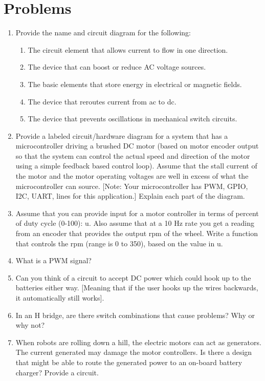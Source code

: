 \hypertarget{problems}{%
\section{Problems}\label{problems}}

\begin{enumerate}
\tightlist
\item
  Provide the name and circuit diagram for the following:

  \begin{enumerate}
  \tightlist
  \item
    The circuit element that allows current to flow in one direction.
  \item
    The device that can boost or reduce AC voltage sources.
  \item
    The basic elements that store energy in electrical or magnetic
    fields.
  \item
    The device that reroutes current from ac to dc.
  \item
    The device that prevents oscillations in mechanical switch circuits.
  \end{enumerate}
\item
  Provide a labeled circuit/hardware diagram for a system that has a
  microcontroller driving a brushed DC motor (based on motor encoder
  output so that the system can control the actual speed and direction
  of the motor using a simple feedback based control loop). Assume that
  the stall current of the motor and the motor operating voltages are
  well in excess of what the microcontroller can source. {[}Note: Your
  microcontroller has PWM, GPIO, I2C, UART, lines for this
  application.{]} Explain each part of the diagram.
\item
  Assume that you can provide input for a motor controller in terms of
  percent of duty cycle (0-100): u. Also assume that at a 10 Hz rate you
  get a reading from an encoder that provides the output rpm of the
  wheel. Write a function that controls the rpm (range is 0 to 350),
  based on the value in u.
\item
  What is a PWM signal?
\item
  Can you think of a circuit to accept DC power which could hook up to
  the batteries either way. {[}Meaning that if the user hooks up the
  wires backwards, it automatically still works{]}.
\item
  In an H bridge, are there switch combinations that cause problems? Why
  or why not?
\item
  When robots are rolling down a hill, the electric motors can act as
  generators. The current generated may damage the motor controllers. Is
  there a design that might be able to route the generated power to an
  on-board battery charger? Provide a circuit.
\end{enumerate}
